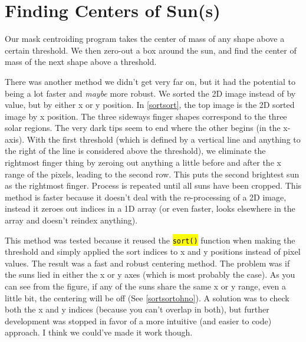 \documentclass[10pt]{scrartcl}
\begin{document}
\section{Finding Centers of Sun(s)} %
\label{sec:finding_centers_of_sun}

Our mask centroiding program takes the center of mass of any shape above a certain threshold. We then zero-out a box around the sun, and find the center of mass of the next shape above a threshold. 

There was another method we didn't get very far on, but it had the potential to being a lot faster and \emph{maybe} more robust. We sorted the 2D image instead of by value, but by either x or y position. In \cref{sortsort}, the top image is the 2D sorted image by x position. The three sideways finger shapes correspond to the three solar regions. The very dark tips seem to end where the other begins (in the x-axis). With the first threshold (which is defined by a vertical line and anything to the right of the line is considered above the threshold), we eliminate the rightmost finger thing by zeroing out anything a little before and after the x range of the pixels, leading to the second row. This puts the second brightest sun as the rightmost finger. Process is repeated until all suns have been cropped. This method is faster because it doesn't deal with the re-processing of a 2D image, instead it zeroes out indices in a 1D array (or even faster, looks elsewhere in the array and doesn't reindex anything).

This method was tested because it reused the \hl{\texttt{sort()}} function when making the threshold and simply applied the sort indices to x and y positions instead of pixel values. The result was a fast and robust centering method. The problem was if the suns lied in either the x or y axes (which is most probably the case). As you can see from the figure, if any of the suns share the same x or y range, even a little bit, the centering will be off (See \cref{sortsortohno}). A solution was to check both the x and y indices (because you can't overlap in both), but further development was stopped in favor of a more intuitive (and easier to code) approach. I think we could've made it work though.\\

\end{document}
